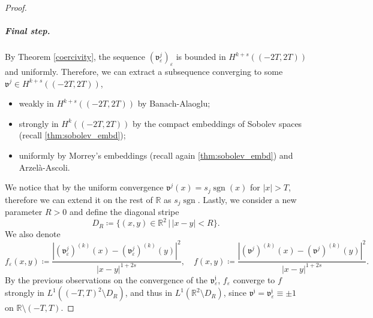 \documentclass{article}
\theoremstyle{definition}
\newcommand{\norm}[1]{\left\lVert #1 \right\rVert}
\newcommand{\abs}[1]{\left|#1\right|}
\newcommand{\R}{\mathbb{R}}
\newcommand{\e}{\varepsilon}
\def\e{\varepsilon}
\newcommand{\sgn}{\operatorname{sgn}}
\begin{document}
\begin{proof}
\subparagraph{Final step.}   By Theorem \ref{coercivity},
   the sequence $(\mathfrak v^j_\e)_\e$ is bounded in $H^{k+s}((-2T,2T))$ and uniformly.
    Therefore, we can extract a subsequence converging to some $\mathfrak v^j\in H^{k+s}((-2T,2T))$, 
    \begin{itemize}
        \item weakly in $H^{k+s}((-2T,2T))$ by Banach-Alaoglu;
        \item strongly in $H^k((-2T,2T))$ by the compact embeddings of Sobolev spaces (recall \ref{thm:sobolev_embd});
         \item uniformly by Morrey's embeddings (recall again \ref{thm:sobolev_embd}) and Arzelà-Ascoli.
    \end{itemize}
    We notice that by the uniform convergence $\mathfrak v^j(x)=s_j \sgn(x)$ for $|x|>T$, therefore we can extend it on the rest of $\R$ as $s_j\sgn$.
    Lastly, we consider a new parameter $R>0$ and define the diagonal stripe
    \begin{equation}
    \label{def:close to diagonal set}
        D_R \coloneqq \big\{(x,y)\in\R^2 \,\big|\,|x-y|<R\big\}.
    \end{equation}
    We also denote
    $$f_\e(x,y) \coloneqq \frac{\abs{(\mathfrak{ v}_\e^j)^{(k)}(x) - (\mathfrak{v}_\e^j)^{(k)}(y)}^2}{\abs{x-y}^{1+2s}}, \quad f(x,y) \coloneqq \frac{\abs{(\mathfrak{v}^j)^{(k)}(x)-(\mathfrak v^j)^{(k)}(y)}^2}{\abs{x-y}^{1+2s}}.$$ 
    By the previous observations on the convergence of the $\mathfrak{ v^j_\e}$, $f_\e$ converge to $f$ strongly in $L^1((-T,T)^2\setminus D_R)$, and thus in $L^1(\R^2\setminus D_R)$, since $\mathfrak{ v^j}= \mathfrak{v^j_\e}\equiv \pm 1$ on $\R\setminus(-T,T)$.
    

\end{proof}
\end{document}
